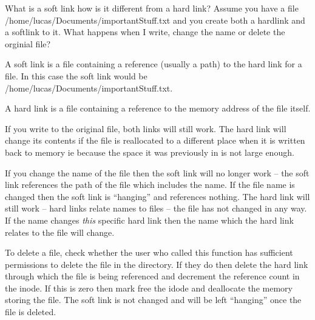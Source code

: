 \documentclass[10pt,\jkfside,a4paper]{article}
\begin{document}
What is a soft link how is it different from a hard link? Assume you have a file 
/home/lucas/Documents/importantStuff.txt and you create both a hardlink and a 
softlink to it. What happens when I write, change the name or delete the orginial file?

A soft link is a file containing a reference (usually a path) to the hard link for a file. 
In this case the soft link would be /home/lucas/Documents/importantStuff.txt.

A hard link is a file containing a reference to the memory address of the file itself.

If you write to the original file, both links will still work. The hard link will change its 
contents if the file is reallocated to a different place when it is written back to memory 
ie because the space it was previously in is not large enough.

If you change the name of the file then the soft link will no longer work -- the soft link 
references the path of the file which includes the name. If the file name is changed then 
the soft link is ``hanging'' and references nothing. The hard link will still work -- hard 
links relate names to files -- the file has not changed in any way. If the name changes 
\textit{this} specific hard link then the name which the hard link relates to the file 
will change.

To delete a file, check whether the user who called this function has sufficient permissions 
to delete the file in the directory. If they do then delete the hard link through which the 
file is being referenced and decrement the reference count in the inode. If this is zero then 
mark free the idode and deallocate the memory storing the file. The soft link is not changed 
and will be left ``hanging'' once the file is deleted.
\end{document}
